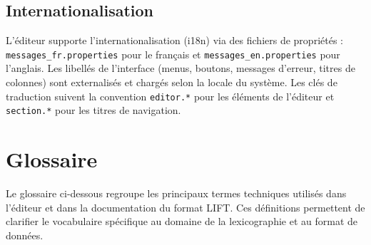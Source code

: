 \documentclass[11pt,twoside,openany]{book}
\begin{document}
\section{Internationalisation}

L'éditeur supporte l'internationalisation (i18n) via des fichiers de propriétés : \texttt{messages\_fr.properties} pour le français et \texttt{messages\_en.properties} pour l'anglais. Les libellés de l'interface (menus, boutons, messages d'erreur, titres de colonnes) sont externalisés et chargés selon la locale du système. Les clés de traduction suivent la convention \texttt{editor.*} pour les éléments de l'éditeur et \texttt{section.*} pour les titres de navigation.


\chapter{Glossaire}

Le glossaire ci-dessous regroupe les principaux termes techniques utilisés dans l'éditeur et dans la documentation du format LIFT. Ces définitions permettent de clarifier le vocabulaire spécifique au domaine de la lexicographie et au format de données.
\end{document}
